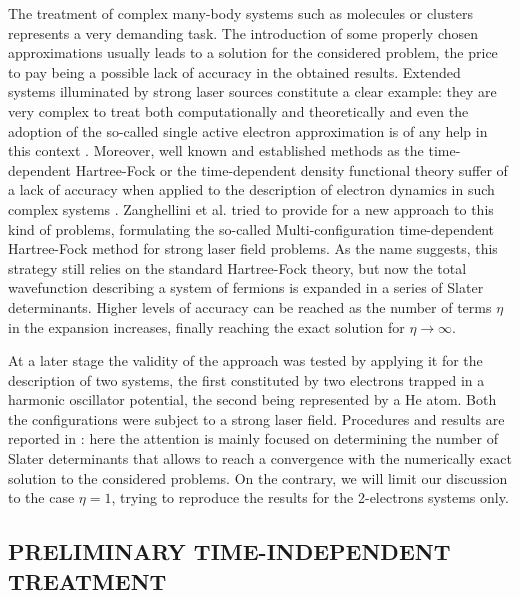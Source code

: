 
The treatment of complex many-body systems such as molecules or clusters represents a very demanding task. The introduction of some properly chosen approximations usually leads to a solution for the considered problem, the price to pay being a possible lack of accuracy in the obtained results. Extended systems illuminated by strong laser sources constitute a clear example: they are very complex to treat both computationally and theoretically and even the adoption of the so-called single active electron approximation is of any help in this context \cite{Zanghellini_2004}. Moreover, well known and established methods as the time-dependent Hartree-Fock or the time-dependent density functional theory suffer of a lack of accuracy when applied to the description of electron dynamics in such complex systems \cite{Zanghellini_2004}. Zanghellini et al. tried to provide for a new approach \cite{Zanghellini_2003} to this kind of problems, formulating the so-called Multi-configuration time-dependent Hartree-Fock method for strong laser field problems. As the name suggests, this strategy still relies on the standard Hartree-Fock theory, but now the total wavefunction describing a system of fermions is expanded in a series of Slater determinants. Higher levels of accuracy can be reached as the number of terms $\eta$ in the expansion increases, finally reaching the exact solution for $\eta \rightarrow \infty$. 

At a later stage the validity of the approach was tested by applying it for the description of two systems, the first constituted by two electrons trapped in a harmonic oscillator potential, the second being represented by a He atom. Both the configurations were subject to a strong laser field. Procedures and results are reported in \cite{Zanghellini_2004}: here the attention is mainly focused on determining the number of Slater determinants that allows to reach a convergence with the numerically exact solution to the considered problems. On the contrary, we will limit our discussion to the case $\eta=1$, trying to reproduce the results for the 2-electrons systems only.

\subsection{PRELIMINARY TIME-INDEPENDENT TREATMENT}

